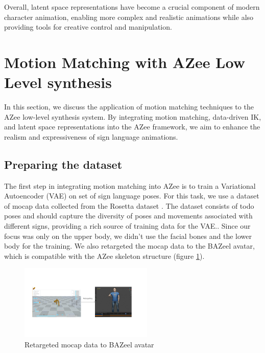 \documentclass[../../main.tex]{subfiles}
\begin{document}
Overall, latent space representations have become a crucial component of modern character animation, enabling more complex and realistic animations while also providing tools for creative control and manipulation.

\section{Motion Matching with AZee Low Level synthesis}
\label{ch:motion_matching:motion_matching_with_azee}

In this section, we discuss the application of motion matching techniques to the AZee low-level synthesis system. By integrating motion matching, data-driven IK, and latent space representations into the AZee framework, we aim to enhance the realism and expressiveness of sign language animations.

\subsection{Preparing the dataset}
\label{ch:motion_matching:motion_matching_with_azee:dataset}

The first step in integrating motion matching into AZee is to train a Variational Autoencoder (VAE) on set of sign language poses. For this task, we use a dataset of mocap data collected from the Rosetta dataset \cite{bertin2022rosetta}. The dataset consists of todo poses and should capture the diversity of poses and movements associated with different signs, providing a rich source of training data for the VAE.. Since our focus was only on the upper body, we didn't use the facial bones and the lower body for the training. We also retargeted the mocap data to the BAZeel avatar, which is compatible with the AZee skeleton structure (figure \ref{fig:retargeted}).

\begin{figure}
  \centering \includegraphics[width = 2.5in]{chapters/motion_matching/images/retargeted.png}
  \caption{Retargeted mocap data to BAZeel avatar}
  \label{fig:retargeted}
\end{figure}
\end{document}
